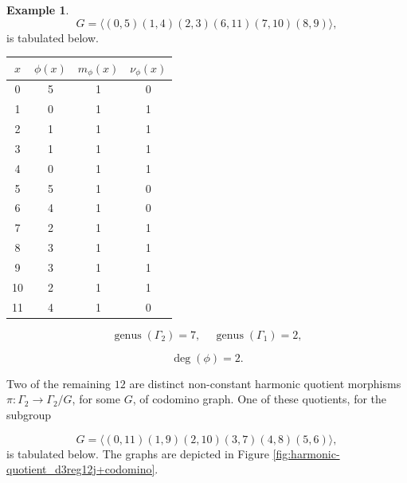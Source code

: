 \documentclass[12pt,letterpaper]{article}
\theoremstyle{definition}
\newtheorem{example}[theorem]{Example}
\DeclareMathOperator{\genus}{genus}
\begin{document}
\begin{example}
{\[
G=\langle  (0,5)(1,4)(2,3)(6,11)(7,10)(8,9) \rangle,
\]
is tabulated below.
\begin{center}
\begin{tabular}{c|c|c|c}  
  $x$ & $\phi(x)$ & $m_\phi(x)$ & $\nu_\phi(x)$ \\ \hline
  0   &    5   &        1         &  0   \\ 
  1   &    0   &        1         &  1   \\ 
  2   &    1   &        1         &  1   \\ 
  3   &    1   &        1         &  1   \\ 
  4   &    0   &        1         &  1   \\ 
  5   &    5   &        1         &  0    \\ 
  6   &    4   &        1         &  0   \\ 
  7   &    2   &        1         &  1   \\
  8   &    3   &        1         &  1   \\
  9   &    3   &        1         &  1   \\
  10  &    2   &        1         &  1   \\
  11  &    4   &        1         &  0   \\ 
\end{tabular}
\end{center}

\[
  \genus(\Gamma_2) =7,\ \ \ \ \
  \genus(\Gamma_1) =2,
\]

\[
\deg(\phi) =2.
\]

Two of the remaining $12$ are distinct non-constant harmonic quotient
morphisms $\pi: \Gamma_2\to \Gamma_2/G$, for some $G$, of
codomino graph.
One of these quotients, for the subgroup

\[
G=\langle (0,11)(1,9)(2,10)(3,7)(4,8)(5,6) \rangle,
\]
is tabulated below. The graphs are depicted in
Figure \ref{fig:harmonic-quotient_d3reg12j+codomino}.

}
\end{example}
\end{document}
